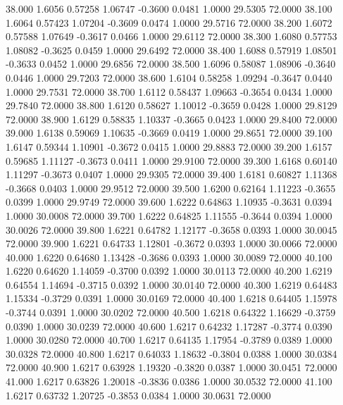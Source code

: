   38.000   1.6056   0.57258   1.06747  -0.3600   0.0481   1.0000  29.5305  72.0000
  38.100   1.6064   0.57423   1.07204  -0.3609   0.0474   1.0000  29.5716  72.0000
  38.200   1.6072   0.57588   1.07649  -0.3617   0.0466   1.0000  29.6112  72.0000
  38.300   1.6080   0.57753   1.08082  -0.3625   0.0459   1.0000  29.6492  72.0000
  38.400   1.6088   0.57919   1.08501  -0.3633   0.0452   1.0000  29.6856  72.0000
  38.500   1.6096   0.58087   1.08906  -0.3640   0.0446   1.0000  29.7203  72.0000
  38.600   1.6104   0.58258   1.09294  -0.3647   0.0440   1.0000  29.7531  72.0000
  38.700   1.6112   0.58437   1.09663  -0.3654   0.0434   1.0000  29.7840  72.0000
  38.800   1.6120   0.58627   1.10012  -0.3659   0.0428   1.0000  29.8129  72.0000
  38.900   1.6129   0.58835   1.10337  -0.3665   0.0423   1.0000  29.8400  72.0000
  39.000   1.6138   0.59069   1.10635  -0.3669   0.0419   1.0000  29.8651  72.0000
  39.100   1.6147   0.59344   1.10901  -0.3672   0.0415   1.0000  29.8883  72.0000
  39.200   1.6157   0.59685   1.11127  -0.3673   0.0411   1.0000  29.9100  72.0000
  39.300   1.6168   0.60140   1.11297  -0.3673   0.0407   1.0000  29.9305  72.0000
  39.400   1.6181   0.60827   1.11368  -0.3668   0.0403   1.0000  29.9512  72.0000
  39.500   1.6200   0.62164   1.11223  -0.3655   0.0399   1.0000  29.9749  72.0000
  39.600   1.6222   0.64863   1.10935  -0.3631   0.0394   1.0000  30.0008  72.0000
  39.700   1.6222   0.64825   1.11555  -0.3644   0.0394   1.0000  30.0026  72.0000
  39.800   1.6221   0.64782   1.12177  -0.3658   0.0393   1.0000  30.0045  72.0000
  39.900   1.6221   0.64733   1.12801  -0.3672   0.0393   1.0000  30.0066  72.0000
  40.000   1.6220   0.64680   1.13428  -0.3686   0.0393   1.0000  30.0089  72.0000
  40.100   1.6220   0.64620   1.14059  -0.3700   0.0392   1.0000  30.0113  72.0000
  40.200   1.6219   0.64554   1.14694  -0.3715   0.0392   1.0000  30.0140  72.0000
  40.300   1.6219   0.64483   1.15334  -0.3729   0.0391   1.0000  30.0169  72.0000
  40.400   1.6218   0.64405   1.15978  -0.3744   0.0391   1.0000  30.0202  72.0000
  40.500   1.6218   0.64322   1.16629  -0.3759   0.0390   1.0000  30.0239  72.0000
  40.600   1.6217   0.64232   1.17287  -0.3774   0.0390   1.0000  30.0280  72.0000
  40.700   1.6217   0.64135   1.17954  -0.3789   0.0389   1.0000  30.0328  72.0000
  40.800   1.6217   0.64033   1.18632  -0.3804   0.0388   1.0000  30.0384  72.0000
  40.900   1.6217   0.63928   1.19320  -0.3820   0.0387   1.0000  30.0451  72.0000
  41.000   1.6217   0.63826   1.20018  -0.3836   0.0386   1.0000  30.0532  72.0000
  41.100   1.6217   0.63732   1.20725  -0.3853   0.0384   1.0000  30.0631  72.0000
